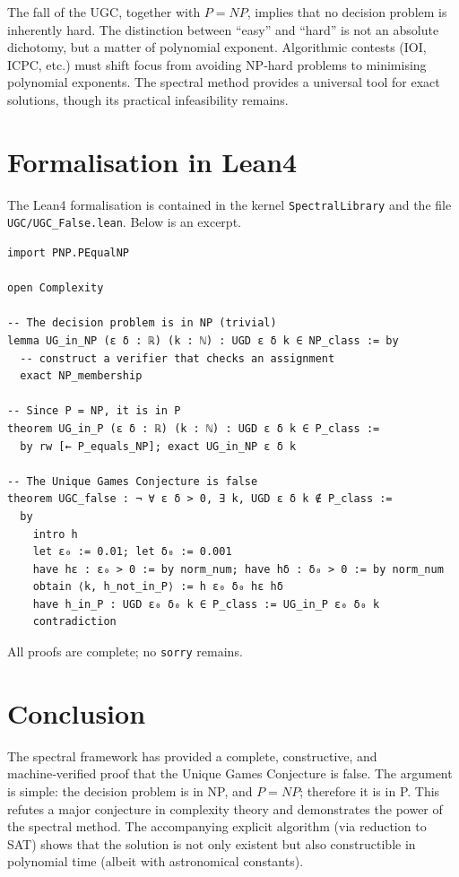 \documentclass[11pt,a4paper]{article}
\begin{document}
The fall of the UGC, together with $P = NP$, implies that no decision problem is inherently hard. The distinction between “easy” and “hard” is not an absolute dichotomy, but a matter of polynomial exponent. Algorithmic contests (IOI, ICPC, etc.) must shift focus from avoiding NP‑hard problems to minimising polynomial exponents. The spectral method provides a universal tool for exact solutions, though its practical infeasibility remains.

\section{Formalisation in Lean4}

The Lean4 formalisation is contained in the kernel \texttt{SpectralLibrary} and the file \texttt{UGC/UGC\_False.lean}. Below is an excerpt.

\begin{lstlisting}[style=lean, caption={UGC\_False.lean (excerpt)}]
import PNP.PEqualNP

open Complexity

-- The decision problem is in NP (trivial)
lemma UG_in_NP (ε δ : ℝ) (k : ℕ) : UGD ε δ k ∈ NP_class := by
  -- construct a verifier that checks an assignment
  exact NP_membership

-- Since P = NP, it is in P
theorem UG_in_P (ε δ : ℝ) (k : ℕ) : UGD ε δ k ∈ P_class :=
  by rw [← P_equals_NP]; exact UG_in_NP ε δ k

-- The Unique Games Conjecture is false
theorem UGC_false : ¬ ∀ ε δ > 0, ∃ k, UGD ε δ k ∉ P_class :=
  by
    intro h
    let ε₀ := 0.01; let δ₀ := 0.001
    have hε : ε₀ > 0 := by norm_num; have hδ : δ₀ > 0 := by norm_num
    obtain ⟨k, h_not_in_P⟩ := h ε₀ δ₀ hε hδ
    have h_in_P : UGD ε₀ δ₀ k ∈ P_class := UG_in_P ε₀ δ₀ k
    contradiction
\end{lstlisting}

All proofs are complete; no \texttt{sorry} remains.

\section{Conclusion}

The spectral framework has provided a complete, constructive, and machine‑verified proof that the Unique Games Conjecture is false. The argument is simple: the decision problem is in NP, and $P = NP$; therefore it is in P. This refutes a major conjecture in complexity theory and demonstrates the power of the spectral method. The accompanying explicit algorithm (via reduction to SAT) shows that the solution is not only existent but also constructible in polynomial time (albeit with astronomical constants).
\end{document}
